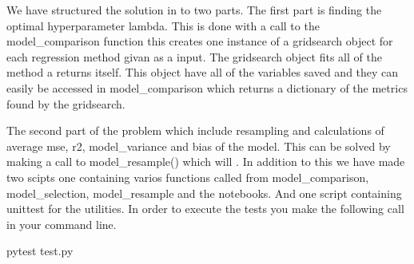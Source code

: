 We have structured the solution in to two parts. The first part is finding the optimal hyperparameter lambda. This is done
with a call to the model_comparison function this creates one instance of a gridsearch object for each regression method
givan as a input. The gridsearch object fits all of the method a returns itself. This object have all of the variables
saved and they can easily be accessed in model_comparison which returns a dictionary of the metrics found by the gridsearch.

The second part of the problem which include resampling and calculations of average mse, r2, model_variance
and bias of the model. This can be solved by making a call to model_resample() which will .
In addition to this we have made two scipts one containing varios functions called from model_comparison, model_selection, model_resample
and the notebooks. And one script containing unittest for the utilities. In order to execute the tests you make the
following call in your command line.

\begin{python}
pytest test.py
\end{python}



